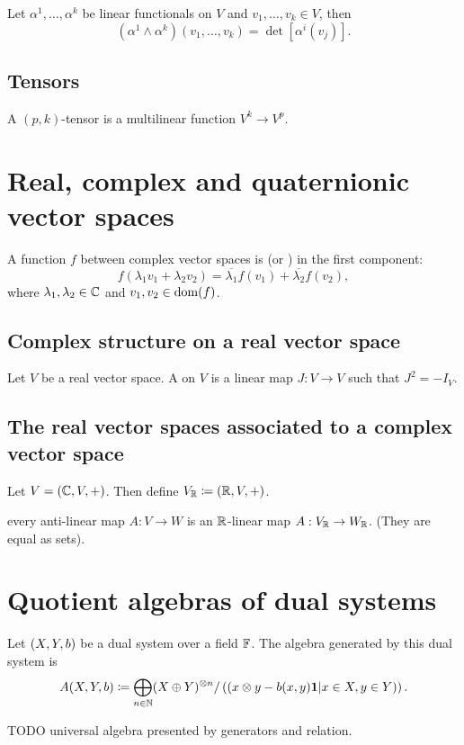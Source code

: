 \begin{lemma}
Let $\alpha^1,\ldots, \alpha^k$ be linear functionals on $V$ and $v_1,\ldots,v_k\in V$, then
\[ (\alpha^1\wedge\alpha^k)(v_1,\ldots, v_k) = \det[\alpha^i(v_j)]. \]
\end{lemma}

\subsection{Tensors}
A $(p,k)$-tensor is a multilinear function $V^k\to V^p$.

\section{Real, complex and quaternionic vector spaces}
\begin{definition}
A function $f$ between complex vector spaces is  (or ) in the first component:
\[f(\lambda_1 v_1 + \lambda_2 v_2) = \overline{\lambda_1}f(v_1) + \overline{\lambda_2}f(v_2),\]
where $\lambda_1,\lambda_2 \in \mathbb{C}$ and $v_1,v_2\in \operatorname{dom}(f)$.
\end{definition}
\subsection{Complex structure on a real vector space}
\begin{definition}
Let $V$ be a real vector space. A  on $V$ is a linear map $J: V\to V$ such that $J^2 = -I_V$.
\end{definition}

\subsection{The real vector spaces associated to a complex vector space}
Let $V = (\mathbb{C}, V, +)$. Then define $V_{\mathbb{R}} \coloneqq (\mathbb{R},V,+)$.

every anti-linear map $A:V\to W$ is an $\mathbb{R}$-linear map $A:V_{\mathbb{R}}\to W_{\mathbb{R}}$. (They are equal as sets).

\section{Quotient algebras of dual systems}
\begin{definition}
Let $\sSet{X,Y,b}$ be a dual system over a field $\mathbb{F}$. The algebra generated by this dual system is
\[ A(X,Y,b) \coloneqq \bigoplus_{n\in\mathbb{N}}(X\oplus Y)^{\otimes n}/\left(\left(x\otimes y - b(x,y)\boldsymbol{\mathrm{1}}\middle|x\in X, y\in Y\right)\right). \]
\end{definition}
TODO universal algebra presented by generators and relation.

